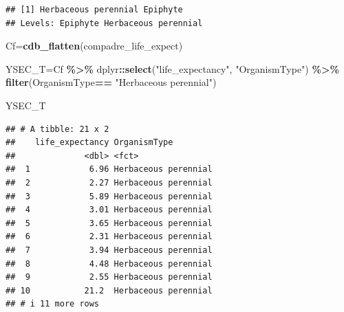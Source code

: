 \documentclass[
]{book}
\newenvironment{Shaded}{\begin{snugshade}}{\end{snugshade}}
\newcommand{\AttributeTok}[1]{\textcolor[rgb]{0.13,0.29,0.53}{#1}}
\newcommand{\DecValTok}[1]{\textcolor[rgb]{0.00,0.00,0.81}{#1}}
\newcommand{\FunctionTok}[1]{\textcolor[rgb]{0.13,0.29,0.53}{\textbf{#1}}}
\newcommand{\NormalTok}[1]{#1}
\newcommand{\OtherTok}[1]{\textcolor[rgb]{0.56,0.35,0.01}{#1}}
\newcommand{\SpecialCharTok}[1]{\textcolor[rgb]{0.81,0.36,0.00}{\textbf{#1}}}
\newcommand{\StringTok}[1]{\textcolor[rgb]{0.31,0.60,0.02}{#1}}
\theoremstyle{definition}
\theoremstyle{definition}
\theoremstyle{definition}
\theoremstyle{definition}
\theoremstyle{remark}
\begin{document}
\begin{Shaded}
\end{Shaded}

\begin{verbatim}
## [1] Herbaceous perennial Epiphyte            
## Levels: Epiphyte Herbaceous perennial
\end{verbatim}

\begin{Shaded}
\begin{Highlighting}[]
\NormalTok{Cf}\OtherTok{=}\FunctionTok{cdb\_flatten}\NormalTok{(compadre\_life\_expect)}


\NormalTok{YSEC\_T}\OtherTok{=}\NormalTok{Cf }\SpecialCharTok{\%\textgreater{}\%} 
\NormalTok{  dplyr}\SpecialCharTok{::}\FunctionTok{select}\NormalTok{(}\StringTok{"life\_expectancy"}\NormalTok{, }\StringTok{"OrganismType"}\NormalTok{) }\SpecialCharTok{\%\textgreater{}\%} 
  \FunctionTok{filter}\NormalTok{(OrganismType}\SpecialCharTok{==} \StringTok{"Herbaceous perennial"}\NormalTok{)}

\NormalTok{YSEC\_T}
\end{Highlighting}
\end{Shaded}

\begin{verbatim}
## # A tibble: 21 x 2
##    life_expectancy OrganismType        
##              <dbl> <fct>               
##  1            6.96 Herbaceous perennial
##  2            2.27 Herbaceous perennial
##  3            5.89 Herbaceous perennial
##  4            3.01 Herbaceous perennial
##  5            3.65 Herbaceous perennial
##  6            2.31 Herbaceous perennial
##  7            3.94 Herbaceous perennial
##  8            4.48 Herbaceous perennial
##  9            2.55 Herbaceous perennial
## 10           21.2  Herbaceous perennial
## # i 11 more rows
\end{verbatim}

\begin{Shaded}
\end{Shaded}
\end{document}
